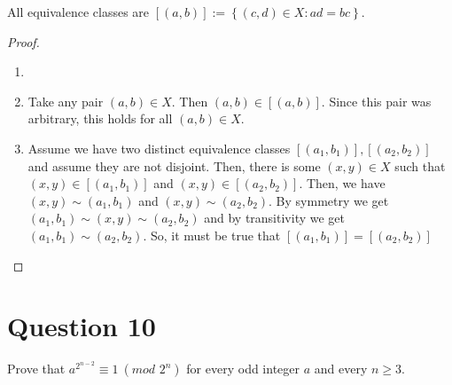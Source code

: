 \documentclass[13pt]{article}
\begin{document}
\newline
All equivalence classes are $[(a, b)] := \left\{ (c, d) \in X : ad = bc \right\}$.
\begin{proof}
  \begin{enumerate}[label=\textit{(\roman*)}]
  \item[]
  \item Take any pair $(a, b) \in X$. Then $(a, b) \in [(a, b)]$. Since this pair was arbitrary,
    this holds for all $(a, b) \in X$.
  \item Assume we have two distinct equivalence classes $[(a_1, b_1)], [(a_2, b_2)]$ and assume they
    are not disjoint. Then, there is some $(x, y) \in X$ such that $(x, y) \in [(a_1, b_1)]$ and
    $(x, y) \in [(a_2, b_2)]$. Then, we have $(x, y) \sim (a_1, b_1)$ and $(x, y) \sim (a_2,
    b_2)$. By symmetry we get $(a_1, b_1) \sim (x, y) \sim (a_2, b_2)$ and by transitivity we get
    $(a_1, b_1) \sim (a_2, b_2)$. So, it must be true that $[(a_1, b_1)] = [(a_2, b_2)]$
  \end{enumerate}
\end{proof}





\newpage
\section*{Question 10}
Prove that $a^{2^{n - 2}} \equiv 1 \ (\textit{mod } 2^n)$ for every odd integer $a$ and every $n \geq 3$.
\end{document}
